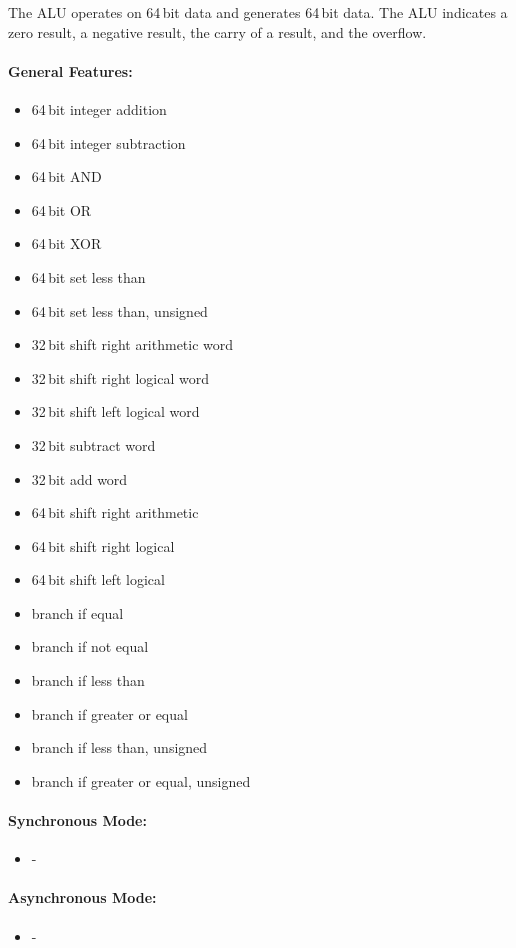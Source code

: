 The ALU operates on 64\,bit data and generates 64\,bit data. The ALU indicates a zero result, a negative result, the carry of a result, and the overflow.

\paragraph{General Features: }
\begin{itemize}
  \item 64\,bit integer addition
  \item 64\,bit integer subtraction
  \item 64\,bit AND
  \item 64\,bit OR
  \item 64\,bit XOR
  \item 64\,bit set less than
  \item 64\,bit set less than, unsigned
  \item 32\,bit shift right arithmetic word
  \item 32\,bit shift right logical word
  \item 32\,bit shift left logical word
  \item 32\,bit subtract word
  \item 32\,bit add word
  \item 64\,bit shift right arithmetic
  \item 64\,bit shift right logical
  \item 64\,bit shift left logical
  \item branch if equal
  \item branch if not equal
  \item branch if less than
  \item branch if greater or equal
  \item branch if less than, unsigned
  \item branch if greater or equal, unsigned
\end{itemize}

\paragraph{Synchronous Mode: }
\begin{itemize}
  \item -
\end{itemize}

\paragraph{Asynchronous Mode: }
\begin{itemize}
  \item -
\end{itemize}
